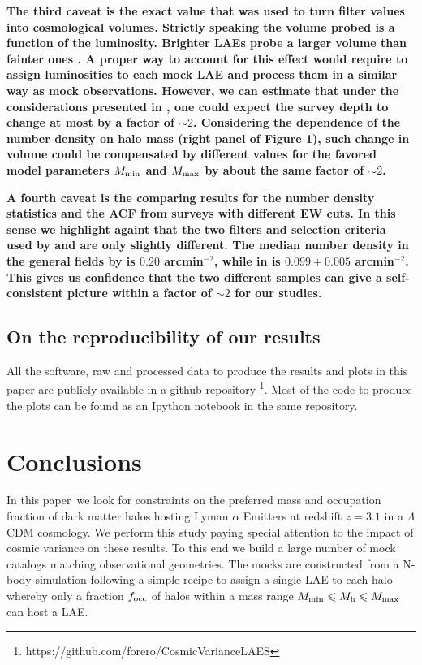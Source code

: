 \documentclass[usenatbib]{mn2e}
\newcommand{\documentname}{paper~}
\newcommand{\ly}{{\ifmmode{{\rm Ly}\alpha}\else{Ly$\alpha$~}\fi}}
\begin{document}
{\bf The third caveat is the exact value that was used to turn
  filter values into cosmological volumes. Strictly speaking the
  volume probed is a function of the \ly luminosity. Brighter LAEs
  probe a larger volume than fainter ones \citep{Gronwall07}. A proper
way to account for this effect would require to assign luminosities to
each mock LAE and process them in a similar way as mock
observations. However, we can estimate that under the considerations
presented in \citep{Gronwall07}, one could expect the survey depth to
change at most by a factor of $\sim2$. Considering the dependence
of the number density on halo mass (right panel of Figure 1), such
change in volume could be compensated by different values for the
favored model parameters $M_{\rm  min}$ and $M_{\rm max}$ by about the
same factor of $\sim2$. }

{\bf A fourth caveat is the comparing results for the number density
  statistics and the ACF from surveys with different EW cuts. In this
  sense we highlight againt that the two filters and selection
  criteria used by \citep{Ouchi2008} and \citep{Yamada2012} are only
  slightly different. The median number density in the general fields by
  \citep{Yamada2012} is $0.20$ arcmin$^{-2}$, while in
  \citep{Ouchi2008} is $0.099\pm0.005$ arcmin$^{-2}$. This gives us
  confidence that the two different samples can give a self-consistent picture
  within a factor of $\sim2$ for our studies.}  



\subsection{On the reproducibility of our results}

All the software, raw and processed data to produce the results
and plots in this paper are publicly available in a github
repository \footnote{https://github.com/forero/CosmicVarianceLAES}. Most
of the code to produce the plots can be found as an Ipython notebook
\citep{IPython} in the same repository.



\section{Conclusions}
\label{sec:conclusions}

In this \documentname we look for constraints on the preferred mass
and occupation fraction of dark matter halos hosting Lyman $\alpha$ Emitters at
redshift $z=3.1$ in a $\Lambda$CDM cosmology. We perform this study
paying special attention to the impact of cosmic variance on these
results. To this end we build a large number of mock catalogs matching
observational geometries. The mocks are constructed from a N-body simulation
following a simple recipe to assign a single LAE to each halo whereby only
a fraction $f_{\rm occ}$ of halos within a mass range  $M_{\rm
  min}\leq M_{\rm h}\leq M_{\rm   max}$ can host a LAE. 
\end{document}
